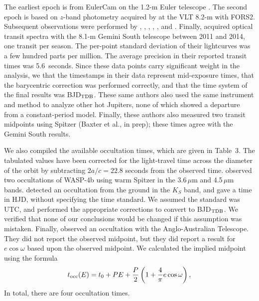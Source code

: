 \documentclass[12pt,twocolumn,tighten]{aastex62}
\begin{document}
The earliest epoch is from EulerCam on the 1.2-m Euler telescope
\citep{wilson_wasp-4b_2008}.  The second epoch is based on $z$-band
photometry acquired by \citet{gillon_improved_2009} at the VLT 8.2-m
with FORS2.  Subsequent observations were performed by
\citet{winn_transit_2009}, \citet{dragomir_terms_2011},
\citet{sanchis-ojeda_starspots_2011}, \citet{nikolov_wasp-4b_2012},
\citet{hoyer_tramos_2013}, and \citet{ranjan_atmospheric_2014}.
Finally, \citet{huitson_gemini_2017} acquired optical transit spectra
with the 8.1-m Gemini South telescope between 2011 and 2014, one
transit per season.  The per-point standard deviation of their
lightcurves was a few hundred parts per million.  The average
precision in their reported transit times was 5.6~seconds.  Since
these data points carry significant weight in the analysis, we
 that the
timestamps in their data represent mid-exposure times, that the
barycentric correction was performed correctly, and that the time
system of the final results was BJD$_{\rm TDB}$.  These same authors
also used the same instrument and method to analyze other hot
Jupiters, none of which showed a departure from a constant-period
model.  Finally, these authors also measured two transit midpoints
using Spitzer (Baxter et al., in prep); these times agree with the
Gemini South results.

We also compiled the available occultation times, which are given in
Table~3.  The tabulated values have been corrected for the
light-travel time across the diameter of the orbit by subtracting
$2a/c = 22.8$ seconds from the observed time.
\citet{beerer_secondary_2011} observed two occultations of WASP-4b
using warm Spitzer in the 3.6\,$\mu$m and 4.5\,$\mu$m bands.
\citet{caceres_ground-based_2011} detected an occultation from the
ground in the $K_S$ band, and gave a time in HJD, without specifying
the time standard.  We assumed the standard was UTC, and performed the
appropriate corrections to convert to BJD$_{\rm TDB}$.  We verified
that none of our conclusions would be changed if this assumption was
mistaken. Finally, \citet{zhou_secondary_2015} observed an occultation
with the Anglo-Australian Telescope.  They did not report the observed
midpoint, but they did report a result for $e\cos\omega$ based upon
the observed midpoint.  We calculated the implied midpoint using the
formula \citep[{\it e.g.},][]{winn_exoplanet_2010}
\begin{equation}
  t_{\rm occ}(E) =
  t_0 +  P E  +
  \frac{P}{2} \left( 1 + \frac{4}{\pi} e\cos\omega \right),
  \label{eq:occultation_time}
\end{equation}
 In total,
there are four  occultation times.
\end{document}
